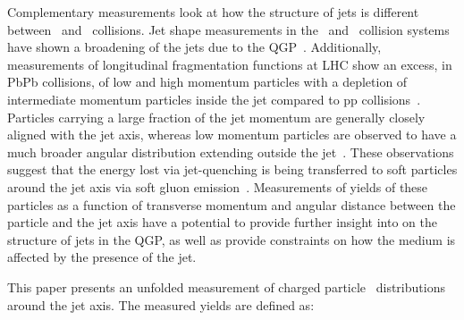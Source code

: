 Complementary measurements look at how the structure of jets is different between \pbpb\ and \pp\
collisions.
Jet shape measurements in the \pp\ and \pbpb\ collision systems have shown 
a broadening of the jets due to the QGP~\cite{Aad:2011sc, Acharya:2018uvf, Chatrchyan:2012mec, Chatrchyan:2013kwa}.
Additionally, measurements of longitudinal fragmentation functions at LHC show an excess, in PbPb collisions, of low and high momentum particles with a depletion of intermediate momentum particles inside the jet compared to pp collisions~\cite{Aad:2014wha,Chatrchyan:2014ava,Aaboud:2017bzv,Aaboud:2018hpb}. Particles carrying a large fraction of the jet momentum are generally closely
aligned with the jet axis, whereas low momentum particles are observed to have a much broader
angular distribution extending outside the 
jet~\cite{Chatrchyan:2011sx,Khachatryan:2015lha,Khachatryan:2016tfj,Sirunyan:2018jqr}. 
These observations suggest that the energy lost via jet-quenching is being transferred to soft particles around the
jet axis via soft 
gluon emission~\cite{Vitev:2008rz,Ovanesyan:2011xy,Blaizot:2014ula,Qin:2015srf,Escobedo:2016jbm,Casalderrey-Solana:2016jvj,Tachibana:2017syd}. 
Measurements of yields of these particles as a function of transverse momentum and
angular distance between the particle and the jet axis have a potential to provide further insight into
on the structure of jets in the QGP, as well as provide constraints on how the medium is affected by the presence of the jet. 

This paper presents an unfolded measurement of charged particle \pt\ distributions around the jet axis. The measured yields are defined as:

